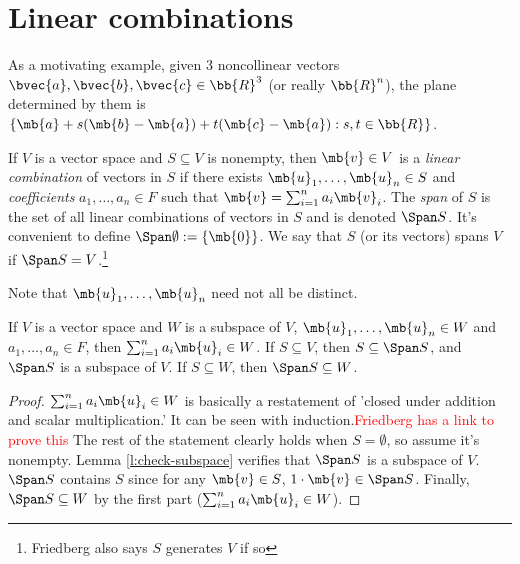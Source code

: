 \section{Linear combinations}
As a motivating example, given 3 noncollinear vectors $\bvec{a}, \bvec{b}, \bvec{c}\in \bb{R}^3$ (or really $\bb{R}^n$), the plane determined by them is $\{ \mb{a}+s( \mb{b}- \mb{a})+t( \mb{c}- \mb{a}): s,t \in \bb{R}\}$.
\begin{defn}
If $V$ is a vector space and $S \subseteq V$ is nonempty, then $\mb{v}\in V$ is a \emph{linear combination} of vectors in $S$ if there exists $\mb{u}_1, \ldots, \mb{u}_n \in S$ and \emph{coefficients} $a_1, \ldots,a_n \in F$ such that $\mb{v}= \sum_{i=1}^na_i \mb{v}_i$.
The \emph{span} of $S$ is the set of all linear combinations of vectors in $S$ and is denoted $\Span S$. It's convenient to define $\Span \emptyset:= \{ \mb{0}\}$. We say that $S$ (or its vectors) spans $V$ if $\Span S=V$.\footnote{Friedberg also says $S$ generates $V$ if so}
\end{defn}
Note that $\mb{u}_1, \ldots, \mb{u}_n$ need not all be distinct.
\begin{lem}\label{l:span-minimal}
If $V$ is a vector space and $W$ is a subspace of $V$, $\mb{u}_1, \ldots, \mb{u}_n \in W$ and $a_1, \ldots,a_n \in F$, then $\sum_{i=1}^na_i \mb{u}_i\in W$. If $S \subseteq V$, then $S \subseteq \Span S$, and $\Span S$ is a subspace of $V$. If $S \subseteq W$, then $\Span S \subseteq W$.
\end{lem}
\begin{proof}
$\sum_{i=1}^na_i \mb{u}_i\in W$ is basically a restatement of 'closed under addition and scalar multiplication.' It can be seen with induction.\textcolor{red}{Friedberg has a link to prove this}
The rest of the statement clearly holds when $S= \emptyset$, so assume it's nonempty. Lemma \ref{l:check-subspace} verifies that $\Span S$ is a subspace of $V$. $\Span S$ contains $S$ since for any $\mb{v}\in S$, $1 \cdot \mb{v}\in \Span S$. Finally, $\Span S \subseteq W$ by the first part ($\sum_{i=1}^na_i \mb{u}_i\in W$).
\end{proof}

